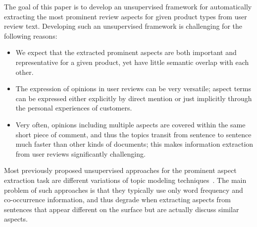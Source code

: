 The goal of this paper is to develop an unsupervised framework 
for automatically extracting the most prominent review aspects for given
product types from user review text.  
Developing such an unsupervised framework is challenging for the following reasons: 
\begin{itemize}
    \item 
	We expect that the extracted prominent aspects are both important and 
representative for a given product, yet have little semantic overlap with each other.
    \item The expression of opinions in user reviews can be very versatile; aspect terms can be expressed either explicitly by direct mention or just implicitly through the personal experiences of customers.
    \item Very often, opinions including multiple aspects are covered within the same
short piece of comment,  and thus the topics transit from sentence to sentence much 
faster than other kinds of documents; 
this makes information extraction from 
user reviews significantly challenging.
\end{itemize}

Most previously proposed unsupervised approaches for the prominent aspect extraction task are 
different variations of topic modeling techniques~\cite{lakkaraju2011exploiting,lin2009joint,wang2011latent}.
The main problem of such approaches 
is that they typically use only word frequency and co-occurrence information, 
and thus degrade when extracting aspects from sentences that appear
different on the surface but are actually discuss similar aspects. 

